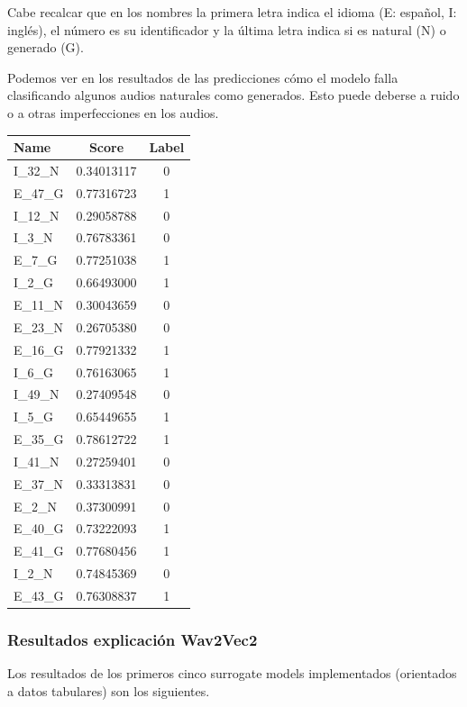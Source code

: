 Cabe recalcar que en los nombres la primera letra indica el idioma (E: español, I: inglés), el número es su identificador y la última letra indica si es natural (N) o generado (G).

Podemos ver en los resultados de las predicciones cómo el modelo falla clasificando algunos audios naturales como generados. Esto puede deberse a ruido o a otras imperfecciones en los audios.

\begin{table}[h]
\centering
\begin{tabular}{|l|c|c|}
\hline
\textbf{Name} & \textbf{Score} & \textbf{Label} \\
\hline
I\_32\_N & 0.34013117 & 0 \\
E\_47\_G & 0.77316723 & 1 \\
I\_12\_N & 0.29058788 & 0 \\
I\_3\_N  & 0.76783361 & 0 \\
E\_7\_G  & 0.77251038 & 1 \\
I\_2\_G  & 0.66493000 & 1 \\
E\_11\_N & 0.30043659 & 0 \\
E\_23\_N & 0.26705380 & 0 \\
E\_16\_G & 0.77921332 & 1 \\
I\_6\_G  & 0.76163065 & 1 \\
I\_49\_N & 0.27409548 & 0 \\
I\_5\_G  & 0.65449655 & 1 \\
E\_35\_G & 0.78612722 & 1 \\
I\_41\_N & 0.27259401 & 0 \\
E\_37\_N & 0.33313831 & 0 \\
E\_2\_N  & 0.37300991 & 0 \\
E\_40\_G & 0.73222093 & 1 \\
E\_41\_G & 0.77680456 & 1 \\
I\_2\_N  & 0.74845369 & 0 \\
E\_43\_G & 0.76308837 & 1 \\
\hline
\end{tabular}
\end{table}

\subsubsection*{Resultados explicación Wav2Vec2}

Los resultados de los primeros cinco surrogate models implementados (orientados a datos tabulares) son los siguientes. 

